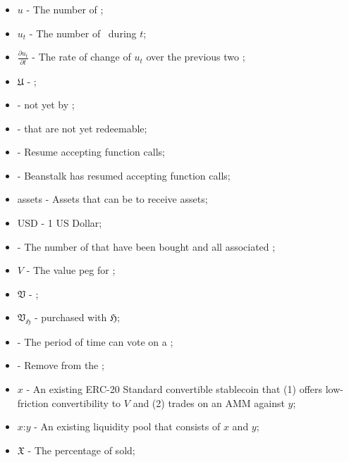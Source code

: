 \documentclass[class=article, crop=false]{standalone}
\begin{document}
\begin{itemize}[topsep=0pt, itemsep=3pt,leftmargin=16pt]
    \item[] $u$ - \hypertarget{ht208}{The number of  \Bean};
    \item[] $u_t$ - The number of  \Bean\ during $t$;
    \item[] $\frac{\partial u_t}{\partial t}$ - The rate of change of $u_t$ over the previous two ;
    \item[] $\mathfrak{U}$ - \hypertarget{ht209}{ };
    \item[]  - \hypertarget{ht210}{ not yet  by };
    \item[]  - \hypertarget{ht211}{ that are not yet redeemable};
    \item[]  - \hypertarget{ht212}{Resume accepting  function calls};
    \item[]  - \hypertarget{ht213}{Beanstalk has resumed accepting  function calls};
    \item[]  assets - \hypertarget{ht214}{Assets that can be  to receive  assets};
    \item[] USD - 1 US Dollar;
    \item[]  - \hypertarget{ht215}{The number of  that have been bought and  all associated };
    \item[] $V$ - \hypertarget{ht216}{The value peg for };
    \item[] $\mathfrak{V}$ - \hypertarget{ht217}{};
    \item[] $\mathfrak{V}_\mathfrak{H}$ - \hypertarget{ht218}{ purchased with  $\mathfrak{H}$};
    \item[]  - \hypertarget{ht219}{The period of time  can vote on a };
    \item[]  - \hypertarget{ht220}{Remove from the };
    \item[] $x$ - \hypertarget{ht223}{An existing ERC-20 Standard convertible stablecoin that (1) offers low-friction convertibility to $V$ and (2) trades on an AMM against $y$};
    \item[] $x$:$y$ - \hypertarget{ht224}{An existing liquidity pool that consists of $x$ and $y$};
    \item[] $\mathfrak{X}$ - \hypertarget{ht225}{The percentage of  sold};

\end{itemize}
\end{document}
